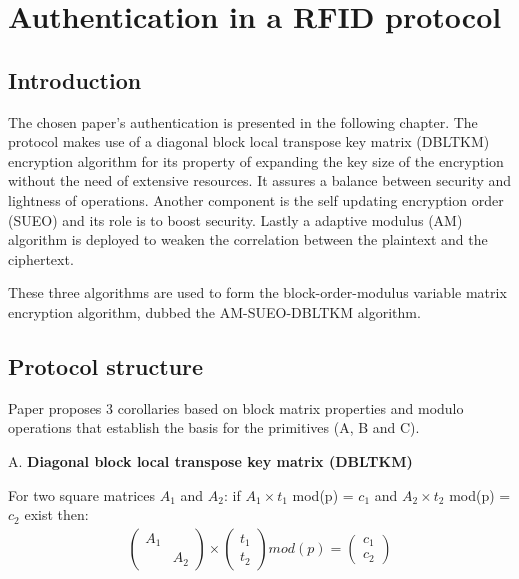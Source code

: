 \chapter{Authentication in a RFID protocol}

\section{Introduction}
    The chosen paper's authentication \cite{BOM} is presented in the following chapter. The protocol makes use of a diagonal block local transpose key matrix (DBLTKM) 
    encryption algorithm for its property of 
    expanding the key size of the encryption without the need of extensive resources. It assures a balance between security and lightness of operations. 
    Another component is the self updating encryption 
    order (SUEO) and its role is to boost security. Lastly a adaptive modulus (AM) algorithm is deployed to weaken the correlation between the 
    plaintext and the ciphertext.
    
    These three algorithms are used to form the block-order-modulus variable matrix encryption algorithm, dubbed the AM-SUEO-DBLTKM algorithm.

\section{Protocol structure}

    Paper \cite{BOM} proposes 3 corollaries based on block matrix properties and modulo operations that establish the basis for the primitives (A, B and C).

    A. \textbf{Diagonal block local transpose key matrix (DBLTKM)}

    For two square matrices $A_1$ and $A_2$: if $A_1 \times t_1$ mod(p) = $c_1$ and $A_2 \times t_2$ mod(p) = $c_2$ exist then:
    \begin{gather*}
        \begin{pmatrix}
        A_1 &  \\
            & A_2
        \end{pmatrix}
        \times
        \begin{pmatrix}
            t_1  \\
            t_2
        \end{pmatrix}
        mod(p)
        =
        \begin{pmatrix}
            c_1  \\
            c_2
        \end{pmatrix}
    \end{gather*}


